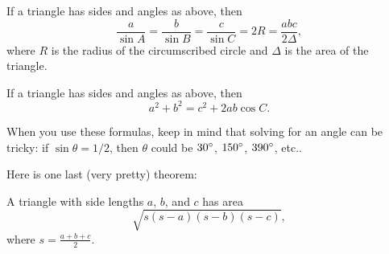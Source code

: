 \begin{thm}
If a triangle has sides and angles as above, then
$$\frac{a}{\sin A}=\frac{b}{\sin B}=\frac{c}{\sin C}=2R=\frac{abc}{2\Delta},$$
where $R$ is the radius of the circumscribed circle and $\Delta$ is the area of the triangle.
\end{thm}

\begin{thm}
If a triangle has sides and angles as above, then
$$a^2+b^2=c^2+2ab\cos C.$$
\end{thm}

When you use these formulas, keep in mind that solving for an angle can be tricky: if $\sin\theta=1/2$, then $\theta$ could be $30\degree$, $150\degree$, $390\degree$, etc..

Here is one last (very pretty) theorem:
\begin{thm}
A triangle with side lengths $a$, $b$, and $c$ has area
$$\sqrt{s(s-a)(s-b)(s-c)},$$
where $s=\frac{a+b+c}{2}$.
\end{thm}


